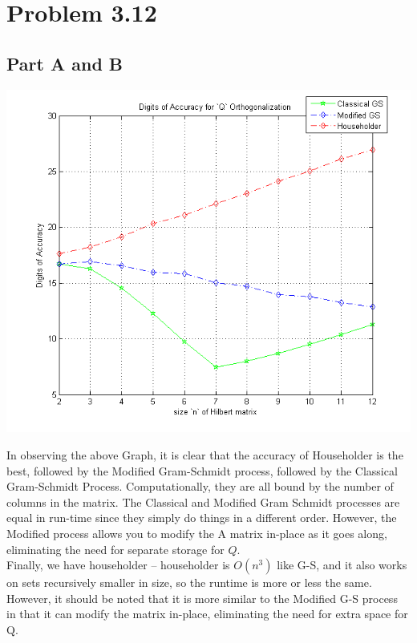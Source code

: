 \documentclass[paper=a4, fontsize=11pt]{scrartcl} %
\numberwithin{equation}{section} %
\numberwithin{figure}{section} %
\numberwithin{table}{section} %
\begin{document}

\section*{Problem 3.12}

\subsection*{Part A and B}
\includegraphics{graph}

In observing the above Graph, it is clear that the accuracy of Householder is the best, followed by the Modified Gram-Schmidt process, followed by the Classical Gram-Schmidt Process. Computationally, they are all bound by the number of columns in the matrix. The Classical and Modified Gram Schmidt processes are equal in run-time since they simply do things in a different order. However, the Modified process allows you to modify the A matrix in-place as it goes along, eliminating the need for separate storage for $Q$. \\

Finally, we have householder -- householder is $O(n^3)$ like G-S, and it also works on sets recursively smaller in size, so the runtime is more or less the same. However, it should be noted that it is more similar to the Modified G-S process in that it can modify the matrix in-place, eliminating the need for extra space for Q.


\end{document}
